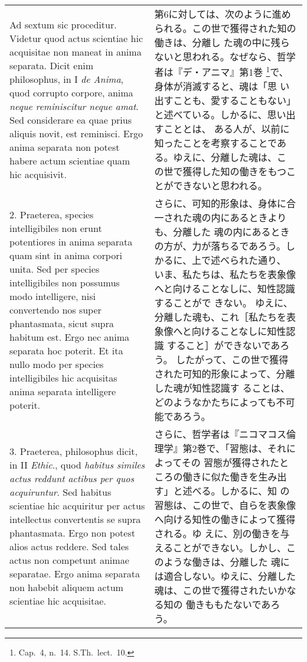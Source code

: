 \documentclass[10pt]{jsarticle} %
\begin{document}
\begin{longtable}{p{21em}p{21em}}

{\huge A}{\sc d sextum sic proceditur}. Videtur quod actus scientiae hic
 acquisitae non maneat in anima separata. Dicit enim philosophus, in I
 {\it de Anima}, quod corrupto corpore, anima {\it neque reminiscitur
 neque amat}. Sed considerare ea quae prius aliquis novit, est
 reminisci. Ergo anima separata non potest habere actum scientiae quam
 hic acquisivit.

&

第6に対しては、次のように進められる。この世で獲得された知の働きは、分離し
 た魂の中に残らないと思われる。なぜなら、哲学者は『デ・アニマ』第1巻
 \footnote{Cap.~4, n.~14. S.Th.~lect.~10.}で、身体が消滅すると、魂は「思
 い出すことも、愛することもない」と述べている。しかるに、思い出すこととは、
 ある人が、以前に知ったことを考察することである。ゆえに、分離した魂は、こ
 の世で獲得した知の働きをもつことができないと思われる。

\\

2. {\sc Praeterea}, species intelligibiles non
 erunt potentiores in anima separata quam sint in anima corpori
 unita. Sed per species intelligibiles non possumus modo intelligere,
 nisi convertendo nos super phantasmata, sicut supra habitum est. Ergo
 nec anima separata hoc poterit. Et ita nullo modo per species
 intelligibiles hic acquisitas anima separata intelligere poterit.

& さらに、可知的形象は、身体に合一された魂の内にあるときよりも、分離した
魂の内にあるときの方が、力が落ちるであろう。しかるに、上で述べられた通り、
いま、私たちは、私たちを表象像へと向けることなしに、知性認識することがで
きない。
ゆえに、分離した魂も、これ［私たちを表象像へと向けることなしに知性認識
 すること］ができないであろう。
したがって、この世で獲得された可知的形象によって、分離した魂が知性認識す
 ることは、どのようなかたちによっても不可能であろう。

\\

3. {\sc Praeterea}, philosophus dicit, in II {\it Ethic}., quod {\it
 habitus similes actus reddunt actibus per quos acquiruntur}. Sed
 habitus scientiae hic acquiritur per actus intellectus convertentis se
 supra phantasmata. Ergo non potest alios actus reddere. Sed tales actus
 non competunt animae separatae. Ergo anima separata non habebit aliquem
 actum scientiae hic acquisitae.

& さらに、哲学者は『ニコマコス倫理学』第2巻で、「習態は、それによってその
習態が獲得されたところの働きに似た働きを生み出す」と述べる。しかるに、知
の習態は、この世で、自らを表象像へ向ける知性の働きによって獲得される。ゆ
えに、別の働きを与えることができない。しかし、このような働きは、分離した
 魂には適合しない。ゆえに、分離した魂は、この世で獲得されたいかなる知の
 働きももたないであろう。




\end{longtable}
\end{document}
